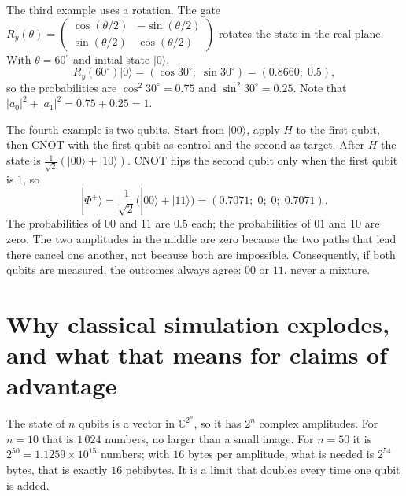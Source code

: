 The third example uses a rotation. The gate
$R_y(\theta)=\begin{pmatrix}\cos(\theta/2)&-\sin(\theta/2)\\
\sin(\theta/2)&\cos(\theta/2)\end{pmatrix}$ rotates the state in the real plane. With
$\theta=60^\circ$ and initial state $|0\rangle$,
\[
R_y(60^\circ)|0\rangle=(\cos 30^\circ;\;\sin 30^\circ)=(0.8660;\;0.5),
\]
so the probabilities are $\cos^{2}30^\circ=0.75$ and $\sin^{2}30^\circ=0.25$. Note that
$|a_0|^2+|a_1|^2=0.75+0.25=1$.

The fourth example is two qubits. Start from $|00\rangle$, apply $H$ to the first qubit,
then CNOT with the first qubit as control and the second as target. After $H$ the state is
$\frac{1}{\sqrt{2}}(|00\rangle+|10\rangle)$. CNOT flips the second qubit only when the
first qubit is $1$, so
\[
|\Phi^{+}\rangle=\frac{1}{\sqrt{2}}\bigl(|00\rangle+|11\rangle\bigr)
=(0.7071;\;0;\;0;\;0.7071).
\]
The probabilities of $00$ and $11$ are $0.5$ each; the probabilities of $01$ and $10$ are
zero. The two amplitudes in the middle are zero because the two paths that lead there
cancel one another, not because both are impossible. Consequently, if both qubits are
measured, the outcomes always agree: $00$ or $11$, never a mixture.


\section{Why classical simulation explodes, and what that means for claims of advantage}

The state of $n$ qubits is a vector in $\mathbb{C}^{2^{n}}$, so it has $2^{n}$ complex
amplitudes. For $n=10$ that is $1\,024$ numbers, no larger than a small image. For $n=50$
it is $2^{50}=1.1259\times10^{15}$ numbers; with $16$ bytes per amplitude, what is needed
is $2^{54}$ bytes, that is exactly $16$ pebibytes. It is a limit that doubles every time
one qubit is added.

